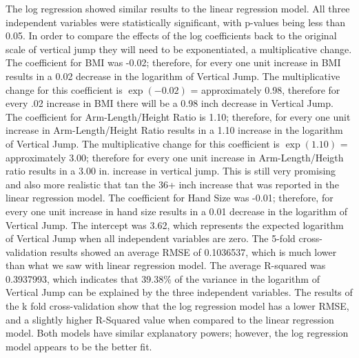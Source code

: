 \documentclass[12pt]{article}
\begin{document}
The log regression showed similar results to the linear regression model. All three independent variables were statistically significant, with p-values being less than 0.05. In order to compare the effects of the log coefficients back to the original scale of vertical jump they will need to be exponentiated, a multiplicative change. The coefficient for BMI was -0.02; therefore, for every one unit increase in BMI results in a 0.02 decrease in the logarithm of Vertical Jump. The multiplicative change for this coefficient is $\exp(-0.02)$ = approximately 0.98, therefore for every .02 increase in BMI there will be a 0.98 inch decrease in Vertical Jump. The coefficient for Arm-Length/Height Ratio is 1.10; therefore, for every one unit increase in Arm-Length/Height Ratio results in a 1.10 increase in the logarithm of Vertical Jump. The multiplicative change for this coefficient is $\exp(1.10)$ = approximately 3.00; therefore for every one unit increase in Arm-Length/Heigth ratio results in a 3.00 in. increase in vertical jump. This is still very promising and also more realistic that tan the 36+ inch increase that was reported in the linear regression model. The coefficient for Hand Size was -0.01; therefore, for every one unit increase in hand size results in a 0.01 decrease in the logarithm of Vertical Jump. The intercept was 3.62, which represents the expected logarithm of Vertical Jump when all independent variables are zero. The 5-fold cross-validation results showed an average RMSE of 0.1036537, which is much lower than what we saw with linear regression model. The average R-squared was 0.3937993, which indicates that 39.38\% of the variance in the logarithm of Vertical Jump can be explained by the three independent variables. The results of the k fold cross-validation show that the log regression model has a lower RMSE, and a slightly higher R-Squared value when compared to the linear regression model. Both models have similar explanatory powers; however, the log regression model appears to be the better fit.

\printbibliography
\end{document}
